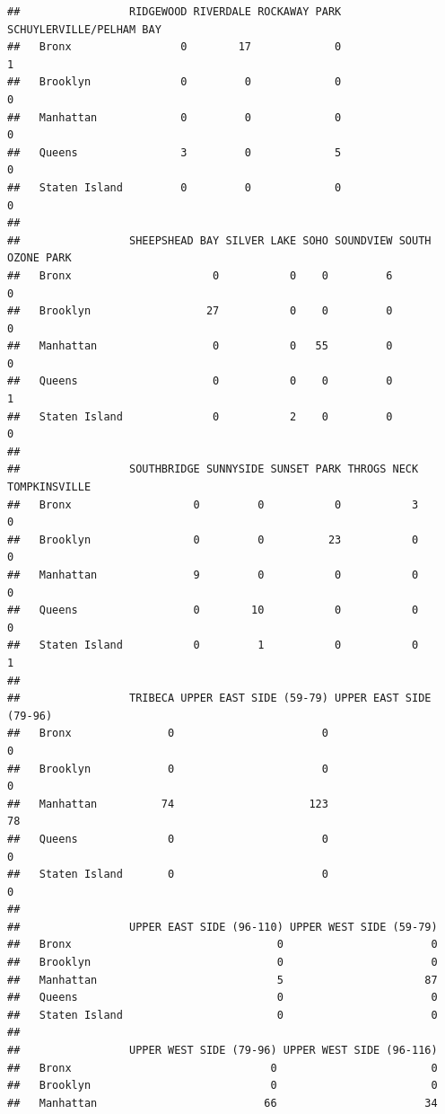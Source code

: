 \documentclass[
]{article}
\begin{document}
\begin{verbatim}
##                 RIDGEWOOD RIVERDALE ROCKAWAY PARK SCHUYLERVILLE/PELHAM BAY
##   Bronx                 0        17             0                        1
##   Brooklyn              0         0             0                        0
##   Manhattan             0         0             0                        0
##   Queens                3         0             5                        0
##   Staten Island         0         0             0                        0
##                
##                 SHEEPSHEAD BAY SILVER LAKE SOHO SOUNDVIEW SOUTH OZONE PARK
##   Bronx                      0           0    0         6                0
##   Brooklyn                  27           0    0         0                0
##   Manhattan                  0           0   55         0                0
##   Queens                     0           0    0         0                1
##   Staten Island              0           2    0         0                0
##                
##                 SOUTHBRIDGE SUNNYSIDE SUNSET PARK THROGS NECK TOMPKINSVILLE
##   Bronx                   0         0           0           3             0
##   Brooklyn                0         0          23           0             0
##   Manhattan               9         0           0           0             0
##   Queens                  0        10           0           0             0
##   Staten Island           0         1           0           0             1
##                
##                 TRIBECA UPPER EAST SIDE (59-79) UPPER EAST SIDE (79-96)
##   Bronx               0                       0                       0
##   Brooklyn            0                       0                       0
##   Manhattan          74                     123                      78
##   Queens              0                       0                       0
##   Staten Island       0                       0                       0
##                
##                 UPPER EAST SIDE (96-110) UPPER WEST SIDE (59-79)
##   Bronx                                0                       0
##   Brooklyn                             0                       0
##   Manhattan                            5                      87
##   Queens                               0                       0
##   Staten Island                        0                       0
##                
##                 UPPER WEST SIDE (79-96) UPPER WEST SIDE (96-116)
##   Bronx                               0                        0
##   Brooklyn                            0                        0
##   Manhattan                          66                       34

\end{verbatim}
\end{document}
